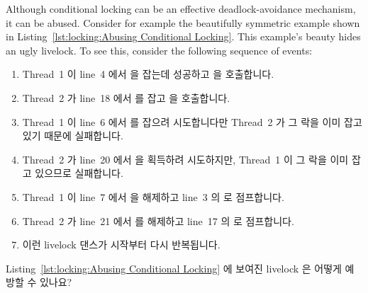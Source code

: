 Although conditional locking can be an effective deadlock-avoidance
mechanism, it can be abused.
Consider for example the beautifully symmetric example shown in
Listing~\ref{lst:locking:Abusing Conditional Locking}.
This example's beauty hides an ugly livelock.
To see this, consider the following sequence of events:
\fi

\begin{enumerate}
\item	Thread~1 이 line~4 에서  을 잡는데 성공하고
	 을 호출합니다.
\item	Thread~2 가 line~18 에서  를 잡고  을
	호출합니다.
\item	Thread~1 이 line~6 에서  를 잡으려 시도합니다만 Thread~2 가
	그 락을 이미 잡고 있기 때문에 실패합니다.
\item	Thread~2 가 line~20 에서  을 획득하려 시도하지만, Thread~1 이
	그 락을 이미 잡고 있으므로 실패합니다.
\item	Thread~1 이 line~7 에서  을 해제하고 line~3 의  로
	점프합니다.
\item	Thread~2 가 line~21 에서  를 해제하고 line~17 의 
	로 점프합니다.
\item	이런 livelock 댄스가 시작부터 다시 반복됩니다.

\end{enumerate}

\QuickQuiz{}
	Listing~\ref{lst:locking:Abusing Conditional Locking} 에 보여진
	livelock 은 어떻게 예방할 수 있나요?
	\iffalse

